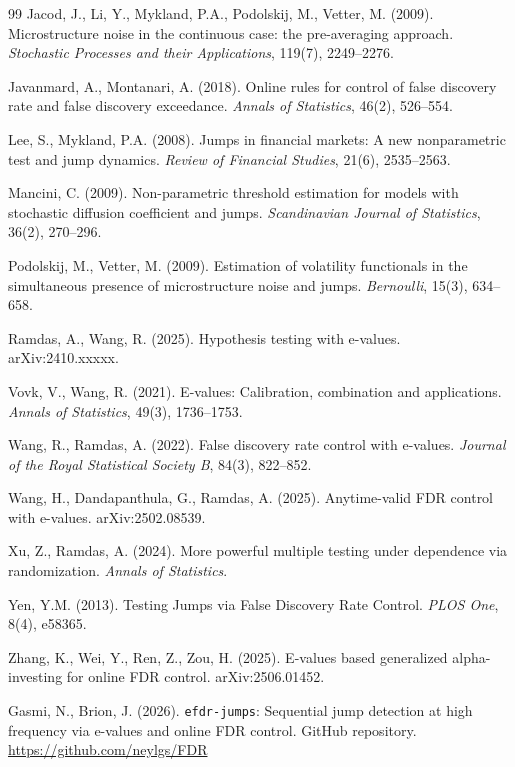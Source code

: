 \documentclass[11pt,a4paper]{article}
\theoremstyle{plain}
\theoremstyle{definition}
\theoremstyle{remark}
\begin{document}
\begin{thebibliography}{99}
Jacod, J., Li, Y., Mykland, P.A., Podolskij, M., Vetter, M. (2009).
Microstructure noise in the continuous case: the pre-averaging approach.
\emph{Stochastic Processes and their Applications}, 119(7), 2249--2276.

Javanmard, A., Montanari, A. (2018).
Online rules for control of false discovery rate and false discovery
exceedance.
\emph{Annals of Statistics}, 46(2), 526--554.

Lee, S., Mykland, P.A. (2008).
Jumps in financial markets: A new nonparametric test and jump dynamics.
\emph{Review of Financial Studies}, 21(6), 2535--2563.

Mancini, C. (2009).
Non-parametric threshold estimation for models with stochastic diffusion
coefficient and jumps.
\emph{Scandinavian Journal of Statistics}, 36(2), 270--296.

Podolskij, M., Vetter, M. (2009).
Estimation of volatility functionals in the simultaneous presence of
microstructure noise and jumps.
\emph{Bernoulli}, 15(3), 634--658.

Ramdas, A., Wang, R. (2025).
Hypothesis testing with e-values.
arXiv:2410.xxxxx.

Vovk, V., Wang, R. (2021).
E-values: Calibration, combination and applications.
\emph{Annals of Statistics}, 49(3), 1736--1753.

Wang, R., Ramdas, A. (2022).
False discovery rate control with e-values.
\emph{Journal of the Royal Statistical Society B}, 84(3), 822--852.

Wang, H., Dandapanthula, G., Ramdas, A. (2025).
Anytime-valid FDR control with e-values.
arXiv:2502.08539.

Xu, Z., Ramdas, A. (2024).
More powerful multiple testing under dependence via randomization.
\emph{Annals of Statistics}.

Yen, Y.M. (2013).
Testing Jumps via False Discovery Rate Control.
\emph{PLOS One}, 8(4), e58365.

Zhang, K., Wei, Y., Ren, Z., Zou, H. (2025).
E-values based generalized alpha-investing for online FDR control.
arXiv:2506.01452.

Gasmi, N., Brion, J. (2026).
\texttt{efdr-jumps}: Sequential jump detection at high frequency via e-values and online FDR control.
GitHub repository.
\url{https://github.com/neylgs/FDR}

\end{thebibliography}
\end{document}
